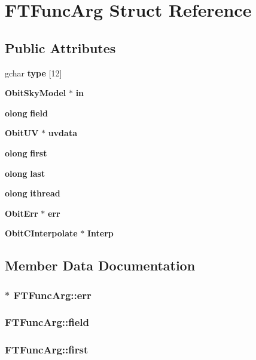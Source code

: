\section{FTFunc\-Arg Struct Reference}
\label{structFTFuncArg}
\subsection*{Public Attributes}
\begin{CompactItemize}
\item 
gchar {\bf type} [12]
\item 
{\bf Obit\-Sky\-Model} $\ast$ {\bf in}
\item 
{\bf olong} {\bf field}
\item 
{\bf Obit\-UV} $\ast$ {\bf uvdata}
\item 
{\bf olong} {\bf first}
\item 
{\bf olong} {\bf last}
\item 
{\bf olong} {\bf ithread}
\item 
{\bf Obit\-Err} $\ast$ {\bf err}
\item 
{\bf Obit\-CInterpolate} $\ast$ {\bf Interp}
\end{CompactItemize}


\subsection{Member Data Documentation}
\subsubsection{$\ast$ {\bf FTFunc\-Arg::err}}\label{structFTFuncArg_o7}


\subsubsection{ {\bf FTFunc\-Arg::field}}\label{structFTFuncArg_o2}


\subsubsection{ {\bf FTFunc\-Arg::first}}\label{structFTFuncArg_o4}


